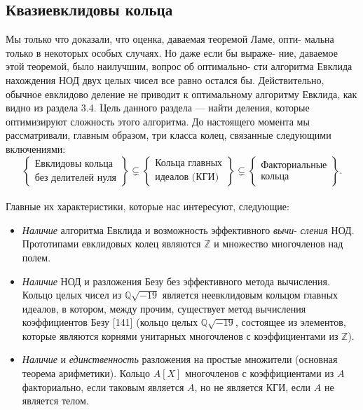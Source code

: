 \subsection{Квазиевклидовы кольца}
\noindent Мы только что доказали, что оценка, даваемая теоремой Ламе, опти-\linebreak
мальна только в некоторых особых случаях. Но даже если бы выраже-\linebreak
ние, даваемое этой теоремой, было наилучшим, вопрос об оптимально-\linebreak
сти алгоритма Евклида нахождения НОД двух целых чисел все равно\linebreak
остался бы. Действительно, обычное евклидово деление не приводит\linebreak
к оптимальному алгоритму Евклида, как видно из раздела 3.4. Цель\linebreak
данного раздела — найти деления, которые оптимизируют сложность\linebreak
этого алгоритма. До настоящего момента мы рассматривали, главным\linebreak
образом, три класса колец, связанные следующими включениями:
$$ \left\lbrace
\begin{array}{c}
\text{Евклидовы кольца} \\
\text{без делителей нуля}
\end{array}
\right\rbrace \subsetneq
\left\lbrace
\begin{array}{l}
\text{Кольца главных} \\
\text{идеалов (КГИ)}
\end{array}
\right\rbrace \subsetneq
\left\lbrace
\begin{array}{l}
\text{Факториальные} \\
\text{кольца}
\end{array}
\right\rbrace .$$
\\
Главные их характеристики, которые нас интересуют, следующие:
\begin{itemize}


\item\textit{Наличие} алгоритма Евклида и возможность эффективного \textit{вычи}-\linebreak
\textit{­сления} НОД. Прототипами евклидовых колец являются $\mathbb{Z}$ и мно­жество многочленов над полем.
\item\textit{Наличие} НОД и разложения Безу без эффективного метода вычисления. Кольцо целых чисел из $\mathbb{Q}\sqrt{-19}$ является неевклидо­вым кольцом главных идеалов, в котором, между прочим, суще­ствует метод вычисления коэффициентов Безу [141] (кольцо це­лых $\mathbb{Q}\sqrt{-19}$, состоящее из элементов, которые являются корнями
унитарных многочленов с коэффициентами из $\mathbb{Z}$).
\item\textit{Наличие} и \textit{единственность} разложения на простые множители
(основная теорема арифметики). Кольцо $A[X]$ многочленов с коэффициентами из $A$ факториально, если таковым является $A$, но
не является КГИ, если $A$ не является телом.
\end{itemize}

